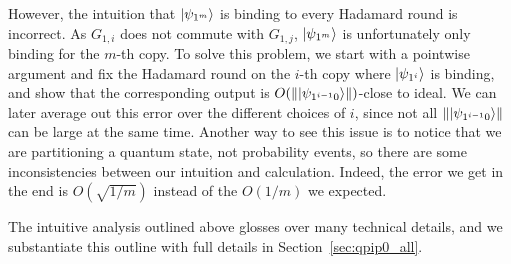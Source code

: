 However, the intuition that $\ket{\psi_{1^m}}$ is binding to every Hadamard round is incorrect. As $G_{1,i}$ does not commute with $G_{1,j}$, $\ket{\psi_{1^m}}$ is unfortunately only binding for the $m$-th copy.
To solve this problem, we start with a pointwise argument and fix the Hadamard round on the $i$-th copy where $\ket{\psi_{1^i}}$ is binding,
and show that the corresponding output is $O(\left\lVert\ket{\psi_{1^{i-1}0}}\right\rVert)$-close to ideal.
We can later average out this error over the different choices of $i$, since not all $\left\lVert\ket{\psi_{1^{i-1}0}}\right\rVert$ can be large at the same time. Another way to see this issue is to notice that we are partitioning a quantum state, not probability events, so there are some inconsistencies between our intuition and calculation. Indeed, the error we get in the end is $O(\sqrt{1/m})$ instead of the $O(1/m)$ we expected. 


The intuitive analysis outlined above glosses over many technical details, and we substantiate this outline with full details in 
Section~\ref{sec:qpip0_all}.


